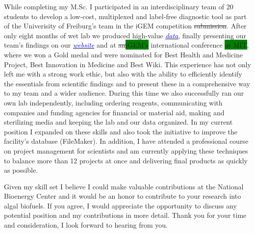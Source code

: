\documentclass[11pt,a4paper,sans]{moderncv}
\begin{document}
\begin{spacing}{1.15}
While completing my M.Sc. I participated in an interdisciplinary team of 20 students to develop a low-cost, multiplexed and label-free diagnostic tool as part of the Univerisity of Freiburg's team in the iGEM competition
\sout{submission}.
After only eight months of wet lab we produced high-value  {\href{https://www.ncbi.nlm.nih.gov/pubmed/29803867}{\textcolor{blue}{\textit{data}}}}, finally presenting our team's findings on our {\href{http://2015.igem.org/Team:Freiburg}{\textcolor{blue}{\textit{website}}}} and at \sout{an}\colorbox{green}{iGEM's} international conference \colorbox{green}{at MIT}, where we won a Gold medal and were nominated for Best Health and Medicine Project, Best Innovation in Medicine and Best Wiki.
This experience has not only left me with a strong work ethic, but also with the ability to efficiently identify the essentials from scientific findings and to present these in a comprehensive way to my team and a wider audience.%
During this time we also successfully ran our own lab independently, including ordering reagents, communicating with companies and funding agencies for financial or material aid, making and sterilizing media and keeping the lab and our data organized. 
In my current position I expanded on these skills and also took the initiative to improve the facility's database (FileMaker). %
In addition, I have attended a professional course on project management for scientists and am currently applying these techniques to balance more than 12  projects at once and delivering final products as quickly as possible.
\par

Given my skill set I believe I could make valuable contributions at the National Bioenergy Center and it would be an honor to contribute to your research into algal biofuels. 
If you agree, I would appreciate the opportunity to discuss any potential position and my contributions in more detail. 
Thank you for your time and consideration, I look forward to hearing from you.


 

\end{spacing}
\makeletterclosing
\end{document}
